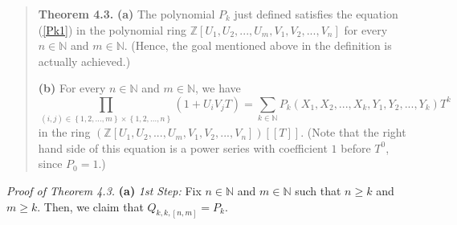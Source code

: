 \documentclass[numbers=enddot,12pt,final,onecolumn,notitlepage]{scrartcl}%
\begin{document}
\begin{quote}
\textbf{Theorem 4.3.} \textbf{(a)} The polynomial $P_{k}$ just defined
satisfies the equation (\ref{Pk1}) in the polynomial ring $\mathbb{Z}\left[
U_{1},U_{2},...,U_{m},V_{1},V_{2},...,V_{n}\right]  $ for every $n\in
\mathbb{N}$ and $m\in\mathbb{N}$. (Hence, the goal mentioned above in the
definition is actually achieved.)

\textbf{(b)} For every $n\in\mathbb{N}$ and $m\in\mathbb{N}$, we have%
\begin{equation}
\prod_{\left(  i,j\right)  \in\left\{  1,2,...,m\right\}  \times\left\{
1,2,...,n\right\}  }\left(  1+U_{i}V_{j}T\right)  =\sum_{k\in\mathbb{N}}%
P_{k}\left(  X_{1},X_{2},...,X_{k},Y_{1},Y_{2},...,Y_{k}\right)  T^{k}
\label{Pk2}%
\end{equation}
in the ring $\left(  \mathbb{Z}\left[  U_{1},U_{2},...,U_{m},V_{1}%
,V_{2},...,V_{n}\right]  \right)  \left[  \left[  T\right]  \right]  $. (Note
that the right hand side of this equation is a power series with coefficient
$1$ before $T^{0}$, since $P_{0}=1$.)
\end{quote}

\textit{Proof of Theorem 4.3.} \textbf{(a)} \textit{1st Step:} Fix
$n\in\mathbb{N}$ and $m\in\mathbb{N}$ such that $n\geq k$ and $m\geq k$. Then,
we claim that $Q_{k,k,\left[  n,m\right]  }=P_{k}$.
\end{document}
